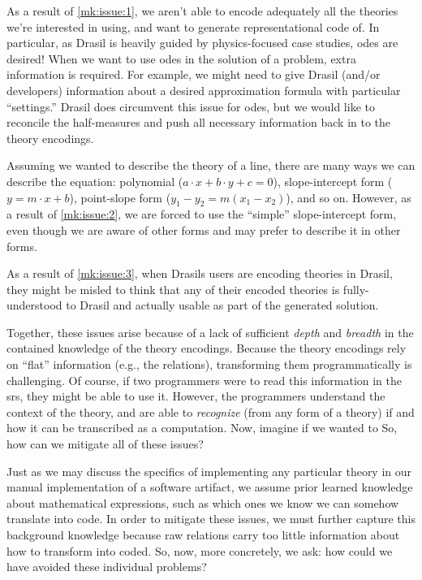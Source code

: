 As a result of \ref{mk:issue:1}, we aren't able to encode adequately all the
theories we're interested in using, and want to generate representational code
of. In particular, as Drasil is heavily guided by physics-focused case studies,
\acsp{ode} are desired! When we want to use \acsp{ode} in the solution of a
problem, extra information is required. For example, we might need to give
Drasil (and/or developers) information about a desired approximation formula
with particular ``settings.'' Drasil does circumvent this issue for \acsp{ode},
but we would like to reconcile the half-measures and push all necessary
information back in to the theory encodings.

Assuming we wanted to describe the theory of a line, there are many ways we can
describe the equation: polynomial (\(a \cdot{} x + b \cdot{} y + c = 0\)),
slope-intercept form (\(y = m \cdot{} x + b\)), point-slope form (\(y_1 - y_2 =
m(x_1 - x_2)\)), and so on. However, as a result of \ref{mk:issue:2}, we are
forced to use the ``simple'' slope-intercept form, even though we are aware of
other forms and may prefer to describe it in other forms.

As a result of \ref{mk:issue:3}, when Drasils users are encoding theories in
Drasil, they might be misled to think that any of their encoded theories is
fully-understood to Drasil and actually usable as part of the generated solution.

Together, these issues arise because of a lack of sufficient \textit{depth} and
\textit{breadth} in the contained knowledge of the theory encodings. Because the
theory encodings rely on ``flat'' information (e.g., the relations),
transforming them programmatically is challenging. Of course, if two programmers
were to read this information in the \acs{srs}, they might be able to use it.
However, the programmers understand the context of the theory, and are able to
\textit{recognize} (from any form of a theory) if and how it can be transcribed
as a computation. Now, imagine if we wanted to  So, how can we mitigate all of
these issues?

Just as we may discuss the specifics of implementing any particular theory in
our manual implementation of a software artifact, we assume prior learned
knowledge about mathematical expressions, such as which ones we know we can
somehow translate into code. In order to mitigate these issues, we must further
capture this background knowledge because raw relations carry too little
information about how to transform into coded. So, now, more concretely, we ask:
how could we have avoided these individual problems?

